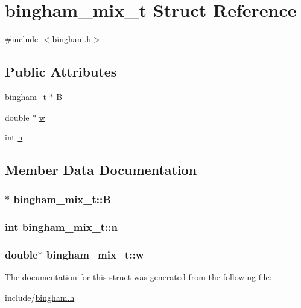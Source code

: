 \hypertarget{structbingham__mix__t}{
\section{bingham\_\-mix\_\-t Struct Reference}
\label{structbingham__mix__t}
}


{\ttfamily \#include $<$bingham.h$>$}

\subsection*{Public Attributes}
\begin{DoxyCompactItemize}
\item 
\hyperlink{structbingham__t}{bingham\_\-t} $\ast$ \hyperlink{structbingham__mix__t_a5bacd8de5ae46bcc20c4f592feff0d27}{B}
\item 
double $\ast$ \hyperlink{structbingham__mix__t_aaecb5ce2377c9c7cbaf483e6e52061a8}{w}
\item 
int \hyperlink{structbingham__mix__t_ad8acb3254601531ca7e0bf649a5cdfd3}{n}
\end{DoxyCompactItemize}


\subsection{Member Data Documentation}
\hypertarget{structbingham__mix__t_a5bacd8de5ae46bcc20c4f592feff0d27}{
\subsubsection[{B}]{$\ast$ {\bf bingham\_\-mix\_\-t::B}}}
\label{structbingham__mix__t_a5bacd8de5ae46bcc20c4f592feff0d27}
\hypertarget{structbingham__mix__t_ad8acb3254601531ca7e0bf649a5cdfd3}{
\subsubsection[{n}]{\setlength{\rightskip}{0pt plus 5cm}int {\bf bingham\_\-mix\_\-t::n}}}
\label{structbingham__mix__t_ad8acb3254601531ca7e0bf649a5cdfd3}
\hypertarget{structbingham__mix__t_aaecb5ce2377c9c7cbaf483e6e52061a8}{
\subsubsection[{w}]{\setlength{\rightskip}{0pt plus 5cm}double$\ast$ {\bf bingham\_\-mix\_\-t::w}}}
\label{structbingham__mix__t_aaecb5ce2377c9c7cbaf483e6e52061a8}


The documentation for this struct was generated from the following file:\begin{DoxyCompactItemize}
\item 
include/\hyperlink{bingham_8h}{bingham.h}\end{DoxyCompactItemize}
